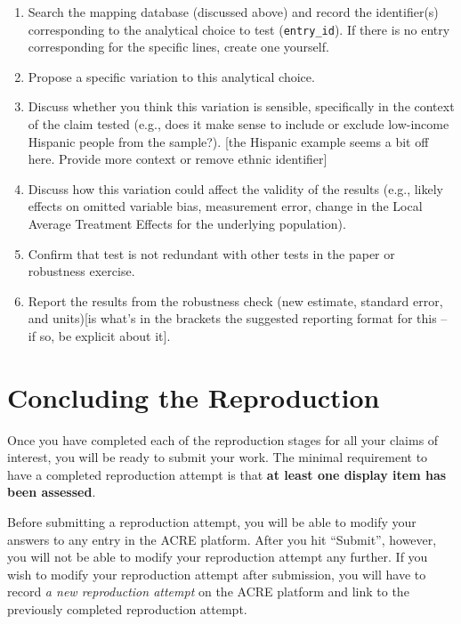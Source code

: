 \documentclass[]{book}
\begin{document}
\begin{enumerate}
\def\labelenumi{\arabic{enumi}.}
\item
  Search the mapping database (discussed above) and record the identifier(s) corresponding to the analytical choice to test (\texttt{entry\_id}). If there is no entry corresponding for the specific lines, create one yourself.
\item
  Propose a specific variation to this analytical choice.
\item
  Discuss whether you think this variation is sensible, specifically in the context of the claim tested (e.g., does it make sense to include or exclude low-income Hispanic people from the sample?). {[}the Hispanic example seems a bit off here. Provide more context or remove ethnic identifier{]}
\item
  Discuss how this variation could affect the validity of the results (e.g., likely effects on omitted variable bias, measurement error, change in the Local Average Treatment Effects for the underlying population).
\item
  Confirm that test is not redundant with other tests in the paper or robustness exercise.
\item
  Report the results from the robustness check (new estimate, standard error, and units){[}is what's in the brackets the suggested reporting format for this -- if so, be explicit about it{]}.
\end{enumerate}

\hypertarget{concluding-the-reproduction}{%
\chapter{Concluding the Reproduction}\label{concluding-the-reproduction}}

Once you have completed each of the reproduction stages for all your claims of interest, you will be ready to submit your work. The minimal requirement to have a completed reproduction attempt is that \textbf{at least one display item has been assessed}.

Before submitting a reproduction attempt, you will be able to modify your answers to any entry in the ACRE platform. After you hit ``Submit'', however, you will not be able to modify your reproduction attempt any further. If you wish to modify your reproduction attempt after submission, you will have to record \emph{a new reproduction attempt} on the ACRE platform and link to the previously completed reproduction attempt.
\end{document}
